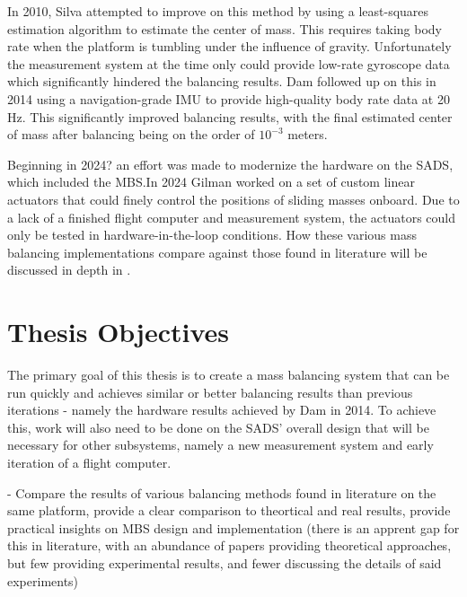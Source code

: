 In 2010, Silva attempted to improve on this method by using a least-squares estimation algorithm to estimate the center of mass. This requires taking body rate when the platform is tumbling under the influence of gravity. Unfortunately the measurement system at the time only could provide low-rate gyroscope data which significantly hindered the balancing results. Dam followed up on this in 2014 using a navigation-grade IMU to provide high-quality body rate data at 20 Hz. This significantly improved balancing results, with the final estimated center of mass after balancing being on the order of $10^{-3}$ meters.

Beginning in 2024? an effort was made to modernize the hardware on the SADS, which included the MBS.\@ In 2024 Gilman worked on a set of custom linear actuators that could finely control the positions of sliding masses onboard. Due to a lack of a finished flight computer and measurement system, the actuators could only be tested in hardware-in-the-loop conditions. How these various mass balancing implementations compare against those found in literature will be discussed in depth in . 


\section{Thesis Objectives}

The primary goal of this thesis is to create a mass balancing system that can be run quickly and achieves similar or better balancing results than previous iterations - namely the hardware results achieved by Dam in 2014. To achieve this, work will also need to be done on the SADS' overall design that will be necessary for other subsystems, namely a new measurement system and early iteration of a flight computer.

- Compare the results of various balancing methods found in literature on the same platform, provide a clear comparison to theortical and real results, provide practical insights on MBS design and implementation (there is an apprent gap for this in literature, with an abundance of papers providing theoretical approaches, but few providing experimental results, and fewer discussing the details of said experiments)
